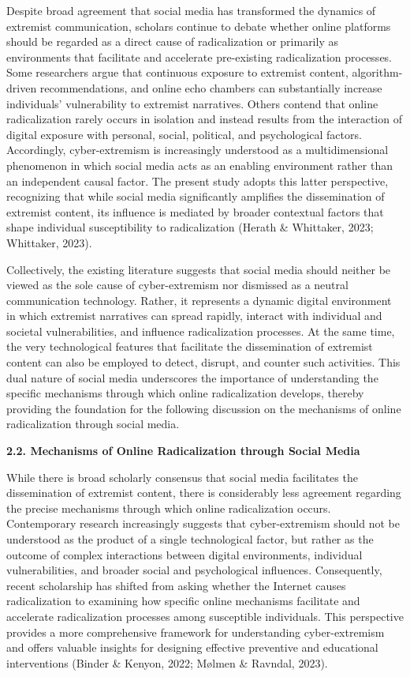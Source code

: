 \documentclass[11pt,a4paper]{article}
\begin{document}
	Despite broad agreement that social media has transformed the dynamics of extremist communication, scholars continue to debate whether online platforms should be regarded as a direct cause of radicalization or primarily as environments that facilitate and accelerate pre-existing radicalization processes. Some researchers argue that continuous exposure to extremist content, algorithm-driven recommendations, and online echo chambers can substantially increase individuals' vulnerability to extremist narratives. Others contend that online radicalization rarely occurs in isolation and instead results from the interaction of digital exposure with personal, social, political, and psychological factors. Accordingly, cyber-extremism is increasingly understood as a multidimensional phenomenon in which social media acts as an enabling environment rather than an independent causal factor. The present study adopts this latter perspective, recognizing that while social media significantly amplifies the dissemination of extremist content, its influence is mediated by broader contextual factors that shape individual susceptibility to radicalization (Herath \& Whittaker, 2023; Whittaker, 2023).
	
	Collectively, the existing literature suggests that social media should neither be viewed as the sole cause of cyber-extremism nor dismissed as a neutral communication technology. Rather, it represents a dynamic digital environment in which extremist narratives can spread rapidly, interact with individual and societal vulnerabilities, and influence radicalization processes. At the same time, the very technological features that facilitate the dissemination of extremist content can also be employed to detect, disrupt, and counter such activities. This dual nature of social media underscores the importance of understanding the specific mechanisms through which online radicalization develops, thereby providing the foundation for the following discussion on the mechanisms of online radicalization through social media.
	
	\textbf{2.2. Mechanisms of Online Radicalization through Social Media}
	
	While there is broad scholarly consensus that social media facilitates the dissemination of extremist content, there is considerably less agreement regarding the precise mechanisms through which online radicalization occurs. Contemporary research increasingly suggests that cyber-extremism should not be understood as the product of a single technological factor, but rather as the outcome of complex interactions between digital environments, individual vulnerabilities, and broader social and psychological influences. Consequently, recent scholarship has shifted from asking whether the Internet causes radicalization to examining how specific online mechanisms facilitate and accelerate radicalization processes among susceptible individuals. This perspective provides a more comprehensive framework for understanding cyber-extremism and offers valuable insights for designing effective preventive and educational interventions (Binder \& Kenyon, 2022; Mølmen \& Ravndal, 2023).
	
\end{document}

